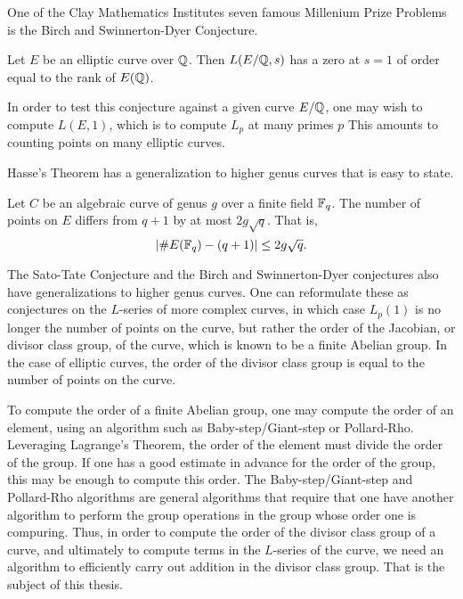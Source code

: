 One of the Clay Mathematics Institutes seven famous Millenium Prize Problems
is the Birch and Swinnerton-Dyer Conjecture.

\begin{conjecture}
  Let $E$ be an elliptic curve over $\mathbb{Q}$.
  Then $L(E/\mathbb{Q}, s)$ has a zero at $s = 1$ of order equal to the rank of $E(\mathbb{Q})$.
\end{conjecture}

In order to test this conjecture against a given curve $E/\mathbb{Q}$,
one may wish to compute $L(E, 1)$, which is to compute $L_p$ at many primes $p$
This amounts to counting points on many elliptic curves.

Hasse's Theorem has a generalization to higher genus curves that is easy to state.
\begin{theorem}
  Let $C$ be an algebraic curve of genus $g$ over a finite field $\mathbb{F}_q$.
  The number of points on $E$ differs from $q + 1$ by at most $2g \sqrt q$.
  That is,
  \[ | \#E(\mathbb{F}_q) - (q + 1) | \leq 2g \sqrt q. \]
\end{theorem}

The Sato-Tate Conjecture and the Birch and Swinnerton-Dyer conjectures
also have generalizations to higher genus curves.
One can reformulate these as conjectures on the $L$-series of more complex curves,
in which case $L_p(1)$ is no longer the number of points on the curve,
but rather the order of the Jacobian, or divisor class group, of the curve,
which is known to be a finite Abelian group.
In the case of elliptic curves, the order of the divisor class group is
equal to the number of points on the curve.

To compute the order of a finite Abelian group, one may compute the order of an element,
using an algorithm such as Baby-step/Giant-step or Pollard-Rho.
Leveraging Lagrange's Theorem, the order of the element must divide the order of the group.
If one has a good estimate in advance for the order of the group, this may be enough
to compute this order.
The Baby-step/Giant-step and Pollard-Rho algorithms are general algorithms that
require that one have another algorithm to perform the group operations in the group
whose order one is compuring.
Thus, in order to compute the order of the divisor class group of a curve,
and ultimately to compute terms in the $L$-series of the curve,
we need an algorithm to efficiently carry out addition in the divisor class group.
That is the subject of this thesis.




